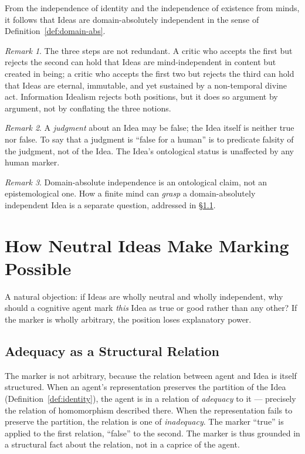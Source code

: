 \documentclass[11pt,a4paper]{article}
\theoremstyle{definition}
\theoremstyle{remark}
\newtheorem{remark}{Remark}[section]
\begin{document}
From the independence of identity and the independence of existence
from minds, it follows that Ideas are domain-absolutely independent in
the sense of Definition~\ref{def:domain-abs}.

\begin{remark}
The three steps are not redundant. A critic who accepts the first but
rejects the second can hold that Ideas are mind-independent in content
but created in being; a critic who accepts the first two but rejects
the third can hold that Ideas are eternal, immutable, and yet sustained
by a non-temporal divine act. Information Idealism rejects both
positions, but it does so argument by argument, not by conflating the
three notions.
\end{remark}

\begin{remark}
A \emph{judgment} about an Idea may be false; the Idea itself is
neither true nor false. To say that a judgment is ``false for a
human'' is to predicate falsity of the judgment, not of the Idea. The
Idea's ontological status is unaffected by any human marker.
\end{remark}

\begin{remark}
Domain-absolute independence is an ontological claim, not an
epistemological one. How a finite mind can \emph{grasp} a
domain-absolutely independent Idea is a separate question, addressed
in \S\ref{sec:access}.
\end{remark}

\section{How Neutral Ideas Make Marking Possible}

A natural objection: if Ideas are wholly neutral and wholly
independent, why should a cognitive agent mark \emph{this} Idea as true
or good rather than any other? If the marker is wholly arbitrary, the
position loses explanatory power.

\subsection{Adequacy as a Structural Relation}\label{sec:access}

The marker is not arbitrary, because the relation between agent and
Idea is itself structured. When an agent's representation preserves
the partition of the Idea (Definition~\ref{def:identity}), the agent
is in a relation of \emph{adequacy} to it --- precisely the relation
of homomorphism described there. When the representation fails to
preserve the partition, the relation is one of \emph{inadequacy}. The
marker ``true'' is applied to the first relation, ``false'' to the
second. The marker is thus grounded in a structural fact about the
relation, not in a caprice of the agent.
\end{document}
